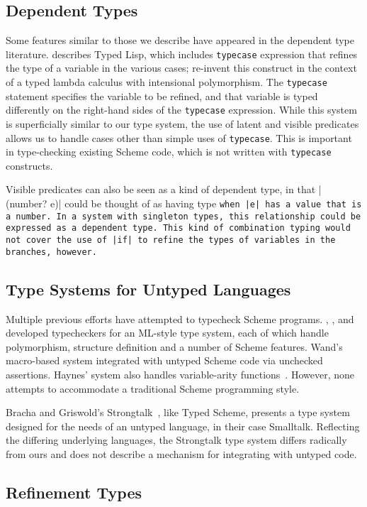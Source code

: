 \subsection{Dependent Types}

Some features similar to those we describe have appeared in the dependent
type literature. \citet{c:typed-lisp} describes Typed Lisp, which includes
{\texttt{typecase}} expression that refines the type of a variable in the
various cases; \citet{weirich98} re-invent this construct in the context of
a typed lambda calculus with intensional polymorphism.  The
{\texttt{typecase}} statement specifies the variable to be refined, and
that variable is typed differently on the right-hand sides of the
\texttt{typecase} expression.  While this system is superficially similar
to our type system, the use of latent and visible predicates allows us
to handle cases other than simple uses of \texttt{typecase}.  This is important
in type-checking existing Scheme code, which is not written with
\texttt{typecase} constructs. 

Visible predicates can also be seen as a kind of dependent type, in
that \scheme|(number? e)| could be thought of as having type \tt when
\scheme|e| has a value that is a number.  In a system with singleton
types, this relationship could be expressed as a dependent type.
This kind of combination typing would not cover the use of \scheme|if| to refine
the types of variables in the branches, however.  

\subsection{Type Systems for Untyped Languages}

Multiple previous efforts have attempted to typecheck Scheme programs.
\citet{wand84}, \citet{h:infer}, and \citet{leavens}
developed typecheckers for an ML-style type system, each of which
handle polymorphism, structure definition and a number of Scheme
features.  Wand's macro-based system integrated with untyped Scheme code via
unchecked assertions.  Haynes' system also handles variable-arity
functions~\cite{var-ar}.  However, none attempts to accommodate a
traditional Scheme programming style.

Bracha and Griswold's Strongtalk~\citeyearpar{strongtalk}, like Typed Scheme, presents
a type system designed for the needs of an untyped language, in their
case Smalltalk. Reflecting the differing underlying languages, the
Strongtalk type system differs radically from ours and does not
describe a mechanism for integrating with untyped code.

\subsection{Refinement Types}





